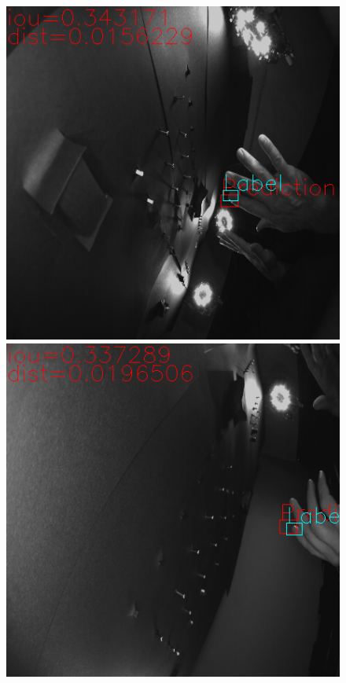 \documentclass[a4paper,12pt]{article}
\begin{document}
\begin{figure}
	\centering
	\begin{minipage}[b]{0.48\textwidth}	
		\includegraphics[width=\textwidth]{BilderResultate/2distKnappGut.png}
	\end{minipage}
	\hfill
	\begin{minipage}[b]{0.48\textwidth}		
		\includegraphics[width=\textwidth]{BilderResultate/5distKnappGut.png}

\end{minipage}
\end{figure}
\end{document}
